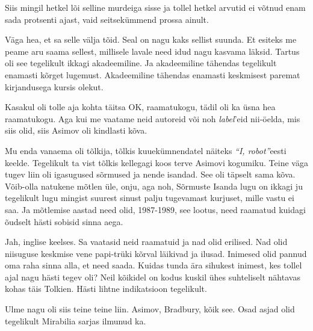 Siis mingil hetkel lõi selline murdeiga sisse ja tollel hetkel arvutid ei 
võtnud enam sada protsenti ajast, vaid seitsekümmend prossa ainult. 


Väga hea, et sa selle välja tõid. Seal on nagu kaks sellist suunda. Et esiteks 
me peame aru saama sellest, millisele lavale  need idud nagu kasvama läksid. 
Tartus oli see tegelikult ikkagi akadeemiline. Ja akadeemiline tähendas 
tegelikult enamasti kõrget lugemust. Akadeemiline tähendas enamasti keskmisest 
paremat kirjandusega kursis olekut.

Kasakul oli tolle aja kohta täitsa OK, raamatukogu, 
tädil oli ka üsna hea raamatukogu. Aga kui me vaatame neid autoreid või noh 
\emph{label}'eid nii-öelda, mis siis olid, siis Asimov oli 
kindlasti kõva. 

Mu enda vanaema oli tõlkija, tõlkis kuuekümnendatel näiteks \emph{\enquote{I, 
robot}}eesti keelde. Tegelikult ta vist tõlkis kellegagi koos terve Asimovi 
kogumiku. Teine väga tugev liin oli igasugused sõrmused ja nende 
isandad. See oli täpselt sama kõva.
Võib-olla natukene mõtlen üle, onju, aga noh, Sõrmuste Isanda lugu  on ikkagi 
ju tegelikult lugu  mingist suurest sinust palju tugevamast kurjuset, mille 
vastu ei saa. Ja mõtlemise aastad need olid, 1987-1989, see lootus, need 
raamatud kuidagi õudselt hästi sobisid sinna aega.


Jah, inglise keelses. Sa vaatasid neid raamatuid ja nad olid erilised. Nad olid 
niisuguse keskmise vene  papi-trüki kõrval läikivad ja ilusad. Inimesed olid 
pannud oma  raha sinna alla, et need saada.  Kuidas tunda ära  sihukest 
inimest, kes tollel ajal nagu hästi tegev oli? Neil kõikidel on kodus kuskil 
ühes suhteliselt nähtavas kohas  täis Tolkien. Hästi lihtne indikatsioon 
tegelikult. 

Ulme nagu oli siis teine teine liin. Asimov, Bradbury, kõik 
see. Osad asjad olid tegelikult Mirabilia sarjas 
ilmunud ka. 

